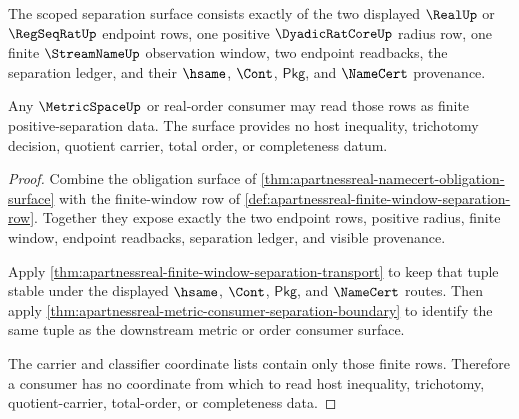\begin{theorem}
\label{thm:apartnessreal-real-separation-scope}
The scoped separation surface consists exactly of the two displayed $\RealUp$ or $\RegSeqRatUp$ endpoint rows, one positive $\DyadicRatCoreUp$ radius row, one finite $\StreamNameUp$ observation window, two endpoint readbacks, the separation ledger, and their $\hsame$, $\Cont$, $\mathsf{Pkg}$, and $\NameCert$ provenance.

Any $\MetricSpaceUp$ or real-order consumer may read those rows as finite positive-separation data. The surface provides no host inequality, trichotomy decision, quotient carrier, total order, or completeness datum.
\end{theorem}
\begin{proof}
Combine the obligation surface of \autoref{thm:apartnessreal-namecert-obligation-surface} with the finite-window row of \autoref{def:apartnessreal-finite-window-separation-row}. Together they expose exactly the two endpoint rows, positive radius, finite window, endpoint readbacks, separation ledger, and visible provenance.

Apply \autoref{thm:apartnessreal-finite-window-separation-transport} to keep that tuple stable under the displayed $\hsame$, $\Cont$, $\mathsf{Pkg}$, and $\NameCert$ routes. Then apply \autoref{thm:apartnessreal-metric-consumer-separation-boundary} to identify the same tuple as the downstream metric or order consumer surface.

The carrier and classifier coordinate lists contain only those finite rows. Therefore a consumer has no coordinate from which to read host inequality, trichotomy, quotient-carrier, total-order, or completeness data.
\end{proof}

